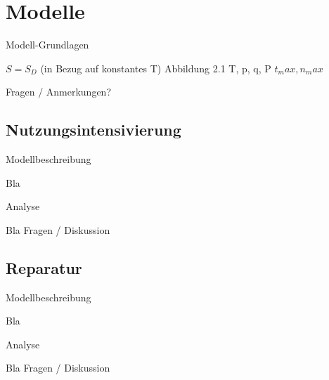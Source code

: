 \documentclass[beamer, xcolor=table]{beamer}
\begin{document}
\section{Modelle}
	\begin{frame}{Modell-Grundlagen}
		\begin{center}
			$S = S_D$ (in Bezug auf konstantes T)
			Abbildung 2.1
			T, p, q, P
			$t_max, n_max$
			
			Fragen / Anmerkungen?
		\end{center}
	\end{frame}

\subsection{Nutzungsintensivierung}
	\frame{\subsectionpage}
	\begin{frame}{Modellbeschreibung}
		\begin{center}
			Bla
		\end{center}
	\end{frame}
	
	\begin{frame}{Analyse}
		\begin{center}
			Bla
			Fragen / Diskussion
		\end{center}
	\end{frame}
	
\subsection{Reparatur}
\frame{\subsectionpage}
	\begin{frame}{Modellbeschreibung}
		\begin{center}
			Bla
		\end{center}
	\end{frame}
	
	\begin{frame}{Analyse}
		\begin{center}
			Bla
			Fragen / Diskussion
		\end{center}
	\end{frame}
\end{document}
